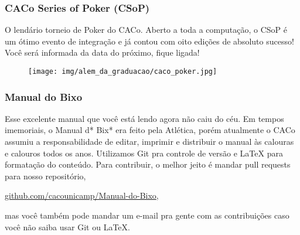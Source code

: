 \subsubsection{CACo Series of Poker (CSoP)}

O lendário torneio de Poker do CACo. Aberto a toda a computação, o CSoP é um
ótimo evento de integração e já contou com oito edições de absoluto sucesso!
Você será informada da data do próximo, fique ligada!

\begin{figure}[H]
  \centering
  \texttt{[image: img/alem\_da\_graduacao/caco\_poker.jpg]}
\end{figure}

\subsubsection{Manual do Bixo}

Esse excelente manual que você está lendo agora não caiu do céu. Em tempos
imemoriais, o Manual d* Bix* era feito pela Atlética, porém atualmente o CACo
assumiu a responsabilidade de editar, imprimir e distribuir o manual às
calouras e calouros todos os anos. Utilizamos Git pra controle de versão e
{\LaTeX} para formatação do conteúdo. Para contribuir, o melhor jeito é mandar
pull requests para nosso repositório,
\begin{center}
\url{github.com/cacounicamp/Manual-do-Bixo},\\
\end{center}
mas você também pode mandar um e-mail pra gen\-te com as contribuições caso
você não saiba usar Git ou \LaTeX.
